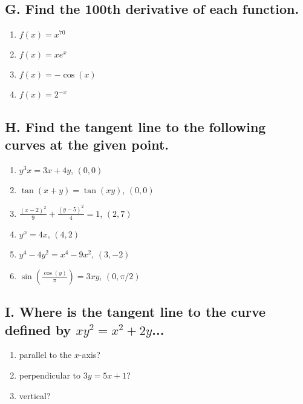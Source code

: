 \documentclass{article}
\begin{document}
\subsection*{G. Find the 100th derivative of each function.}
\begin{multicols}{4}
\begin{enumerate}
\item $f(x)=x^{70}$
\item $f(x)=xe^{x}$
\item $f(x)=-\cos(x)$
\item $f(x)=2^{-x}$
\end{enumerate}
\end{multicols}


\subsection*{H. Find the tangent line to the following curves at the given point.}

\begin{multicols}{3}
\begin{enumerate}
\item $y^{3}x=3x+4y$, $(0,0)$
\item $\tan\left(x+y\right)=\tan\left(xy\right)$, $(0,0)$
\item $\frac{\left(x-2\right)^{2}}{9}+\frac{\left(y-5\right)^{2}}{4}=1$, $(2,7)$
\item $y^{x}=4x$, $(4,2)$
\item $y^{4}-4y^{2}=x^{4}-9x^{2}$, $(3,-2)$
\item $\sin\left(\frac{\cos\left(y\right)}{\pi}\right)=3xy$, $(0,\pi/2)$
\end{enumerate}
\end{multicols}


\subsection*{I. Where is the tangent line to the curve defined by $xy^{2}=x^{2}+2y$...}

\begin{enumerate}
\item parallel to the $x$-axis?
\item perpendicular to $3y=5x+1$?
\item vertical?
\end{enumerate}
\end{document}
